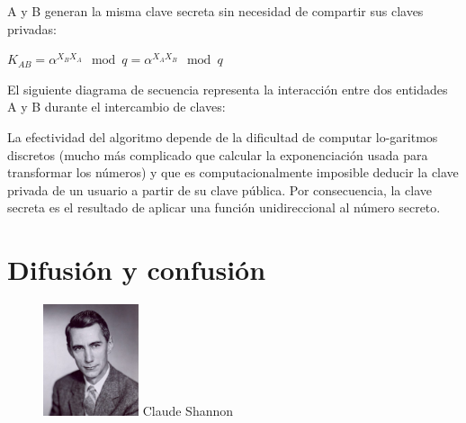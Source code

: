 \documentclass[11pt]{article}
\begin{document}
A y B generan la misma clave secreta sin necesidad de compartir sus claves privadas:

\begin{center}
$K_{AB} = \alpha^{X_B X_A} \mod q = \alpha^{X_A X_B} \mod q$
\end{center}

El siguiente diagrama de secuencia representa la interacción entre dos entidades A y B durante el intercambio de claves:
\begin{center}\end{center}

La efectividad del algoritmo depende de la dificultad de computar lo-garitmos discretos (mucho más complicado que calcular la exponenciación usada para transformar los números) y que es computacionalmente imposible deducir la clave privada de un usuario a partir de su clave pública. Por consecuencia, la clave secreta es el resultado de aplicar una función unidireccional al número secreto.

\newpage


\section{Difusión y confusión}

\begin{figure} %
    \centering
    \includegraphics[width=0.25\textwidth]{img/Shannon.jpg}
    Claude Shannon
\end{figure}
\end{document}
